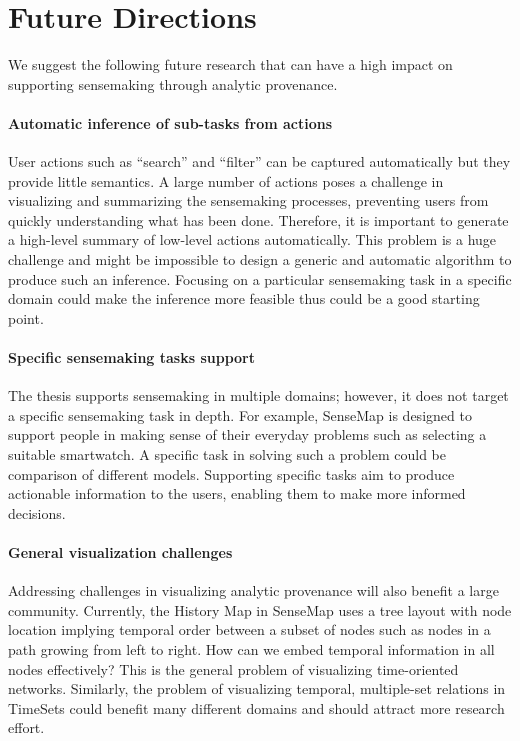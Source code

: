 \section{Future Directions}
We suggest the following future research that can have a high impact on supporting sensemaking through analytic provenance.

\paragraph{Automatic inference of sub-tasks from actions}
User actions such as ``search'' and ``filter'' can be captured automatically but they provide little semantics. A large number of actions poses a challenge in visualizing and summarizing the sensemaking processes, preventing users from quickly understanding what has been done. Therefore, it is important to generate a high-level summary of low-level actions automatically. This problem is a huge challenge and might be impossible to design a generic and automatic algorithm to produce such an inference. Focusing on a particular sensemaking task in a specific domain could make the inference more feasible thus could be a good starting point.

\paragraph{Specific sensemaking tasks support}
The thesis supports sensemaking in multiple domains; however, it does not target a specific sensemaking task in depth. For example, SenseMap is designed to support people in making sense of their everyday problems such as selecting a suitable smartwatch. A specific task in solving such a problem could be comparison of different models. Supporting specific tasks aim to produce actionable information to the users, enabling them to make more informed decisions.

\paragraph{General visualization challenges}
Addressing challenges in visualizing analytic provenance will also benefit a large community. Currently, the History Map in SenseMap uses a tree layout with node location implying temporal order between a subset of nodes such as nodes in a path growing from left to right. How can we embed temporal information in all nodes effectively? This is the general problem of visualizing time-oriented networks. Similarly, the problem of visualizing temporal, multiple-set relations in TimeSets could benefit many different domains and should attract more research effort.

